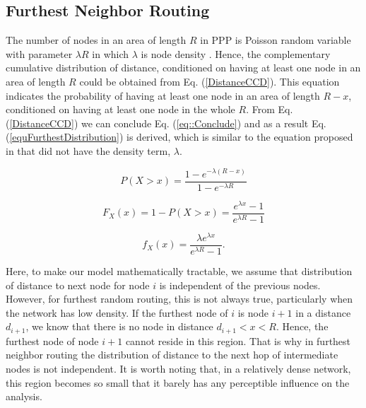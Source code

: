 \documentclass[12pt, draftclsnofoot, onecolumn]{IEEEtran}
\begin{document}
%


\subsection{Furthest Neighbor Routing}

The number of nodes in an area of length $R$ in PPP is Poisson random variable 
with parameter $\lambda R$ in which $\lambda$ is node density \cite{ppp}. 
Hence, the complementary cumulative distribution of distance, conditioned on 
having at least one node in an area of length $R$ could be obtained from
Eq. (\ref{DistanceCCD}). This equation indicates the probability of having 
at least one node in an area of length $R-x$, conditioned on having at least one 
node in the whole $R$. From Eq. (\ref{DistanceCCD}) we can conclude 
Eq. (\ref{eq::Conclude}) and as a result Eq. (\ref{equFurthestDistribution})
is derived, which is similar to the equation proposed in \cite{haenggi2005distances} that did not have the density term, $\lambda$.

\begin{equation}
\label{DistanceCCD}
P(X>x) = \frac{1-e^{-\lambda (R-x)}}{1-e^{-\lambda R}}
\end{equation}

\begin{equation}
\label{eq::Conclude}
	F_X(x) = 1 - P(X>x) = \frac{e^{\lambda x}-1}{e^{\lambda R}-1}
\end{equation}

\begin{equation}
\label{equFurthestDistribution}
	f_X(x) = \frac{\lambda e^{\lambda x}}{e^{\lambda R}-1}.
\end{equation}

Here, to make our model mathematically tractable, we assume 
that distribution of distance to next node for node $i$ is independent 
of the previous nodes. However, for furthest random routing, this is 
not always true, particularly when the network has low density. If the 
furthest node of $i$ is node $i+1$ in a distance $d_{i+1}$, we know 
that there is no node in distance $d_{i+1}<x<R$. Hence, the furthest 
node of node $i+1$ cannot reside in this region. That is why in furthest 
neighbor routing the distribution of distance to the next hop of intermediate 
nodes is not independent. It is worth noting that, in a relatively dense network, 
this region becomes so small that it barely has any perceptible influence 
on the analysis.
\end{document}
